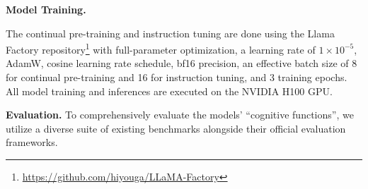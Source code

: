 \textbf{Model Training.}

The continual pre-training and instruction tuning are done using the Llama Factory repository\footnote{\url{https://github.com/hiyouga/LLaMA-Factory}} with full-parameter optimization, a learning rate of $1\times10^{-5}$, AdamW, cosine learning rate schedule, bf16 precision, an effective batch size of 8 for continual pre-training and 16 for instruction tuning, and 3 training epochs. All model training and inferences are executed on the NVIDIA H100 GPU.


\textbf{Evaluation.}
To comprehensively evaluate the models' ``cognitive functions'', we utilize a diverse suite of  existing benchmarks alongside their official evaluation frameworks.

